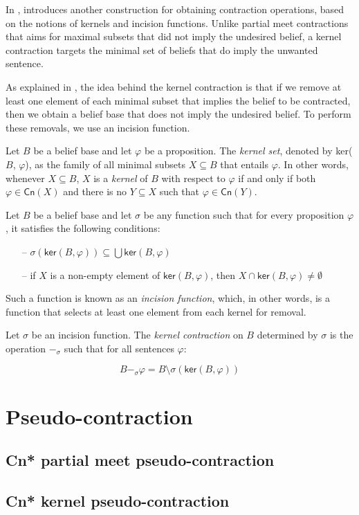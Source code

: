 In \citep{Hansson1994}, \citeauthor{Hansson1994} introduces another construction for obtaining contraction operations, based on the notions of kernels and incision functions. Unlike partial meet contractions that aims for maximal subsets that did not imply the undesired belief, a kernel contraction targets the minimal set of beliefs that do imply the unwanted sentence.

As explained in \citep{Wassermann2000}, the idea behind the kernel contraction is that if we remove at least one element of each minimal subset that implies the belief to be contracted, then we obtain a belief base that does not imply the undesired belief. To perform these removals, we use an incision function.

\begin{definition}
    Let $B$ be a belief base and let $\varphi$ be a proposition. The \textit{kernel set}, denoted by \textsf{ker}($B$, $\varphi$), as the family of all minimal subsets $X \subseteq B$ that entails $\varphi$. In other words, whenever $X \subseteq B$, $X$ is a \textit{kernel} of $B$ with respect to $\varphi$ if and only if both $\varphi \in \textsf{Cn}(X)$ and there is no $Y \subseteq X$ such that $\varphi \in \textsf{Cn}(Y)$.
\end{definition}

\begin{definition}
    Let $B$ be a belief base and let $\sigma$ be any function such that for every proposition $\varphi$, it satisfies the following conditions:
    \begin{itemize}
        \item [--] $\sigma(\textsf{ker}(B, \varphi)) \subseteq \bigcup \textsf{ker}(B, \varphi)$ 
        \item [--] if $X$ is a non-empty element of $\textsf{ker}(B, \varphi)$, then $X \cap \textsf{ker}(B, \varphi) \neq \emptyset$
    \end{itemize}
    
    Such a function is known as an \textit{incision function}, which, in other words, is a function that selects at least one element from each kernel for removal.
\end{definition}

\begin{definition}
    Let $\sigma$ be an incision function. The \textit{kernel contraction} on $B$ determined by $\sigma$ is the operation $-_{\sigma}$ such that for all sentences $\varphi$:

    $$B -_{\sigma} \varphi = B \setminus \sigma(\textsf{ker}(B, \varphi))$$
\end{definition}

\section{Pseudo-contraction}
\subsection{Cn* partial meet pseudo-contraction}
\subsection{Cn* kernel pseudo-contraction}
